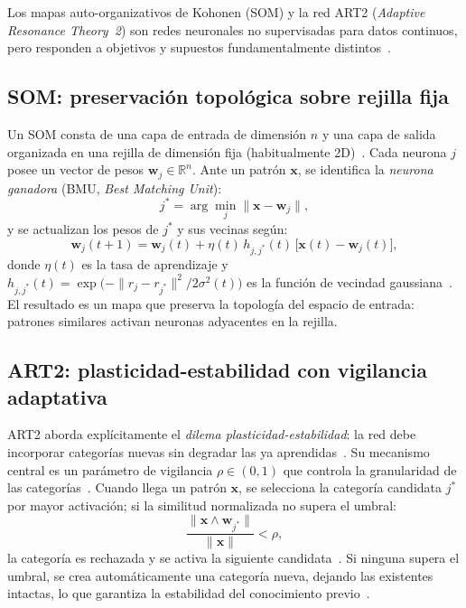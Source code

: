 Los mapas auto-organizativos de Kohonen (SOM) y la red ART2 (\textit{Adaptive Resonance Theory~2}) son redes neuronales no supervisadas para datos continuos, pero responden a objetivos y supuestos fundamentalmente distintos~\cite{jain1999clustering}.

\subsection{SOM: preservación topológica sobre rejilla fija}

Un SOM consta de una capa de entrada de dimensión $n$ y una capa de salida organizada en una rejilla de dimensión fija (habitualmente 2D)~\cite{kohonen1990som}. Cada neurona $j$ posee un vector de pesos $\mathbf{w}_j \in \mathbb{R}^n$. Ante un patrón $\mathbf{x}$, se identifica la \emph{neurona ganadora} (BMU, \textit{Best Matching Unit}):
\[
j^* = \arg\min_{j} \|\mathbf{x} - \mathbf{w}_j\|,
\]
y se actualizan los pesos de $j^*$ y sus vecinas según:
\[
\mathbf{w}_j(t+1) = \mathbf{w}_j(t) + \eta(t)\,h_{j,j^*}(t)\,\bigl[\mathbf{x}(t) - \mathbf{w}_j(t)\bigr],
\]
donde $\eta(t)$ es la tasa de aprendizaje y $h_{j,j^*}(t) = \exp\!\bigl(-\|r_j - r_{j^*}\|^2 / 2\sigma^2(t)\bigr)$ es la función de vecindad gaussiana~\cite{kohonen1990som}. El resultado es un mapa que preserva la topología del espacio de entrada: patrones similares activan neuronas adyacentes en la rejilla.

\subsection{ART2: plasticidad-estabilidad con vigilancia adaptativa}

ART2 aborda explícitamente el \emph{dilema plasticidad-estabilidad}: la red debe incorporar categorías nuevas sin degradar las ya aprendidas~\cite{grossberg1987competitive}. Su mecanismo central es un parámetro de vigilancia $\rho \in (0,1)$ que controla la granularidad de las categorías~\cite{carpenter1987art2}. Cuando llega un patrón $\mathbf{x}$, se selecciona la categoría candidata $j^*$ por mayor activación; si la similitud normalizada no supera el umbral:
\[
\frac{\|\mathbf{x} \wedge \mathbf{w}_{j^*}\|}{\|\mathbf{x}\|} < \rho,
\]
la categoría es rechazada y se activa la siguiente candidata~\cite{carpenter1987art2}. Si ninguna supera el umbral, se crea automáticamente una categoría nueva, dejando las existentes intactas, lo que garantiza la estabilidad del conocimiento previo~\cite{grossberg1987competitive}.

